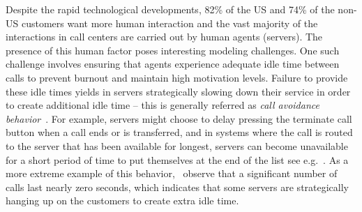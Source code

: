 \documentclass[a4paper,11pt,twoside]{article}
\numberwithin{equation}{section}
\numberwithin{figure}{section}
\theoremstyle{plain}
\newcommand{\1}{\mathbbm{1}}
\begin{document}
Despite the rapid technological developments, 82\% of the US and 74\% of the non-US customers want more human interaction \cite{pwc2018} and the vast majority of the interactions in call centers are carried out by human agents (servers). The presence of this human factor poses interesting modeling challenges. One such challenge involves ensuring that agents experience adequate idle time between calls to prevent burnout and maintain high motivation levels. Failure to provide these idle times yields in servers strategically slowing down their service in order to create additional idle time -- this is generally referred as \emph{call avoidance behavior}~\cite{go4cust21}. 
For example, servers might choose to delay pressing the terminate call button when a call ends or is transferred, and in systems where the call is routed to the server that has been available for longest, servers can become unavailable for a short period of time to put themselves at the end of the list see e.g.~\cite{CallCentreHelper17}. As a more extreme example of this behavior,~\cite{Gans2003} observe that a significant number of calls last nearly zero seconds, which indicates that some servers are strategically hanging up on the customers to create extra idle time.
\end{document}
